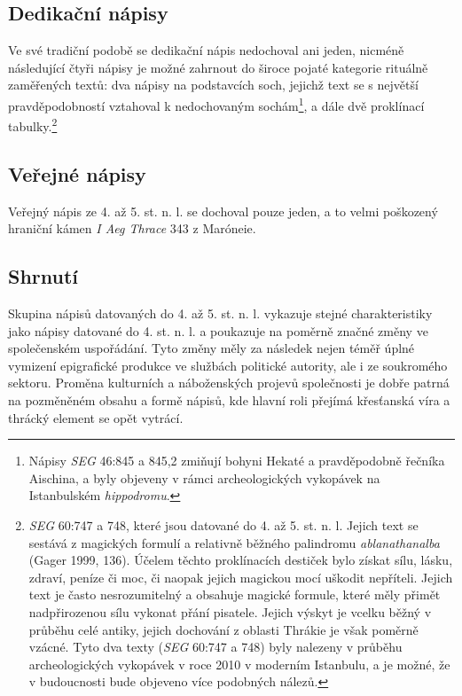 \subsection[dedikační-nápisy-18]{Dedikační nápisy}

Ve své tradiční podobě se dedikační nápis nedochoval ani jeden, nicméně následující čtyři nápisy je možné zahrnout do široce pojaté kategorie rituálně zaměřených textů: dva nápisy na podstavcích soch, jejichž text se s největší pravděpodobností vztahoval k nedochovaným sochám\footnote{Nápisy {\em SEG} 46:845 a 845,2 zmiňují bohyni Hekaté a pravděpodobně řečníka Aischina, a byly objeveny v rámci archeologických vykopávek na Istanbulském {\em hippodromu}.}, a dále dvě proklínací tabulky.\footnote{{\em SEG} 60:747 a 748, které jsou datované do 4. až 5. st. n. l. Jejich text se sestává z magických formulí a relativně běžného palindromu {\em ablanathanalba} (Gager 1999, 136). Účelem těchto proklínacích destiček bylo získat sílu, lásku, zdraví, peníze či moc, či naopak jejich magickou mocí uškodit nepříteli. Jejich text je často nesrozumitelný a obsahuje magické formule, které měly přimět nadpřirozenou sílu vykonat přání pisatele. Jejich výskyt je vcelku běžný v průběhu celé antiky, jejich dochování z oblasti Thrákie je však poměrně vzácné. Tyto dva texty ({\em SEG} 60:747 a 748) byly nalezeny v průběhu archeologických vykopávek v roce 2010 v moderním Istanbulu, a je možné, že v budoucnosti bude objeveno více podobných nálezů.}

\subsection[veřejné-nápisy-18]{Veřejné nápisy}

Veřejný nápis ze 4. až 5. st. n. l. se dochoval pouze jeden, a to velmi poškozený hraniční kámen {\em I Aeg Thrace} 343 z Maróneie.

\subsection[shrnutí-22]{Shrnutí}

Skupina nápisů datovaných do 4. až 5. st. n. l. vykazuje stejné charakteristiky jako nápisy datované do 4. st. n. l. a poukazuje na poměrně značné změny ve společenském uspořádání. Tyto změny měly za následek nejen téměř úplné vymizení epigrafické produkce ve službách politické autority, ale i ze soukromého sektoru. Proměna kulturních a náboženských projevů společnosti je dobře patrná na pozměněném obsahu a formě nápisů, kde hlavní roli přejímá křesťanská víra a thrácký element se opět vytrácí.

